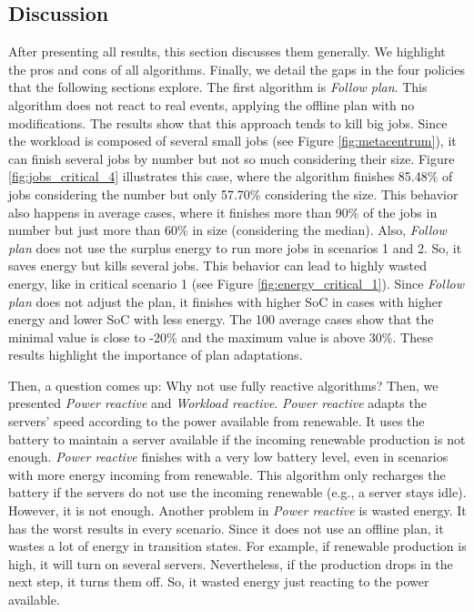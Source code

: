\clearpage

\subsection{Discussion}
\label{sec:compensation_discussion}

After presenting all results, this section discusses them generally. We highlight the pros and cons of all algorithms. Finally, we detail the gaps in the four policies that the following sections explore. The first algorithm is \emph{Follow plan}. This algorithm does not react to real events, applying the offline plan with no modifications. The results show that this approach tends to kill big jobs. Since the workload is composed of several small jobs (see Figure \ref{fig:metacentrum}), it can finish several jobs by number but not so much considering their size. Figure \ref{fig:jobs_critical_4} illustrates this case, where the algorithm finishes 85.48\% of jobs considering the number but only 57.70\% considering the size. This behavior also happens in average cases, where it finishes more than 90\% of the jobs in number but just more than 60\% in size (considering the median). Also, \emph{Follow plan} does not use the surplus energy to run more jobs in scenarios 1 and 2. So, it saves energy but kills several jobs. This behavior can lead to highly wasted energy, like in critical scenario 1 (see Figure \ref{fig:energy_critical_1}). Since \emph{Follow plan} does not adjust the plan, it finishes with higher SoC in cases with higher energy and lower SoC with less energy. The 100 average cases show that the minimal value is close to -20\% and the maximum value is above 30\%. These results highlight the importance of plan adaptations.

Then, a question comes up: Why not use fully reactive algorithms? Then, we presented \emph{Power reactive} and \emph{Workload reactive}. \emph{Power reactive} adapts the servers' speed according to the power available from renewable. It uses the battery to maintain a server available if the incoming renewable production is not enough. \emph{Power reactive} finishes with a very low battery level, even in scenarios with more energy incoming from renewable. This algorithm only recharges the battery if the servers do not use the incoming renewable (e.g., a server stays idle). However, it is not enough. Another problem in \emph{Power reactive} is wasted energy. It has the worst results in every scenario. Since it does not use an offline plan, it wastes a lot of energy in transition states. For example, if renewable production is high, it will turn on several servers. Nevertheless, if the production drops in the next step, it turns them off. So, it wasted energy just reacting to the power available.

